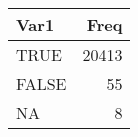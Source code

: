 
\begin{tabular}[t]{lr}
\toprule
Var1 & Freq\\
\midrule
TRUE & 20413\\
FALSE & 55\\
NA & 8\\
\bottomrule
\end{tabular}